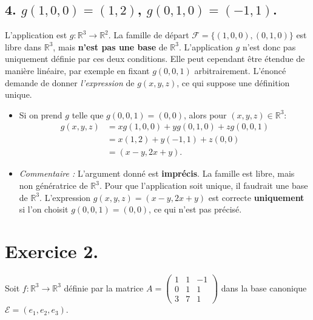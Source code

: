 \documentclass[french]{yLectureNote}
\begin{document}
\subsection*{4. $g(1,0,0)=(1,2)$, $g(0,1,0)=(-1,1)$.}
L'application est $g: \mathbb{R}^3 \to \mathbb{R}^2$. La famille de départ $\mathcal{F} = \{(1,0,0), (0,1,0)\}$ est libre dans $\mathbb{R}^3$, mais \textbf{n'est pas une base} de $\mathbb{R}^3$.
L'application $g$ n'est donc pas uniquement définie par ces deux conditions. Elle peut cependant être étendue de manière linéaire, par exemple en fixant $g(0,0,1)$ arbitrairement.
L'énoncé demande de donner \emph{l'expression} de $g(x,y,z)$, ce qui suppose une définition unique.
\begin{itemize}
    \item Si on prend $g$ telle que $g(0,0,1)=(0,0)$, alors pour $(x,y,z) \in \mathbb{R}^3$:
    \begin{align*} g(x,y,z) &= x g(1,0,0) + y g(0,1,0) + z g(0,0,1) \\ &= x(1,2) + y(-1,1) + z(0,0) \\ &= (x-y, 2x+y). \end{align*}
    \item \emph{Commentaire :} L'argument donné est \textbf{imprécis}. La famille est libre, mais non génératrice de $\mathbb{R}^3$. Pour que l'application soit unique, il faudrait une base de $\mathbb{R}^3$. L'expression $g(x,y,z)=(x-y,2x+y)$ est correcte \textbf{uniquement} si l'on choisit $g(0,0,1)=(0,0)$, ce qui n'est pas précisé.
\end{itemize}

\section*{Exercice 2.}
Soit $f:\mathbb{R}^3 \to \mathbb{R}^3$ définie par la matrice $A = \begin{pmatrix} 1 & 1 & -1 \\ 0 & 1 & 1 \\ 3 & 7 & 1 \end{pmatrix}$ dans la base canonique $\mathcal{E} = (e_1, e_2, e_3)$.
\end{document}
